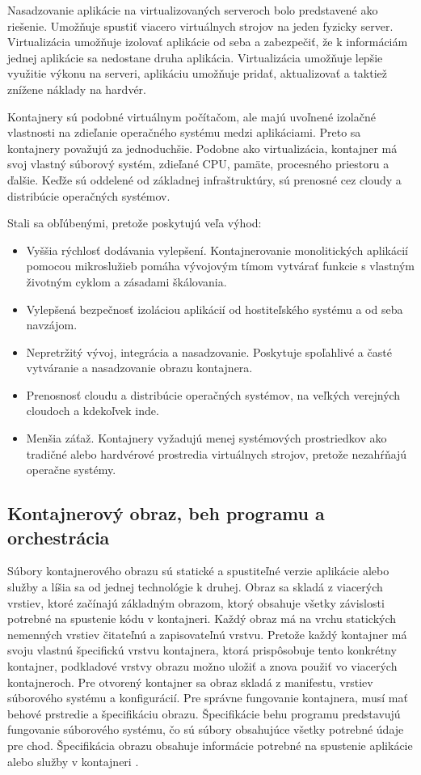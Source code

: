 Nasadzovanie aplikácie na virtualizovaných serveroch bolo predstavené ako riešenie. Umožňuje spustiť viacero virtuálnych strojov na jeden fyzicky server. Virtualizácia umožňuje izolovať aplikácie od seba a zabezpečiť, že k informáciám jednej aplikácie sa nedostane druha aplikácia. Virtualizácia umožňuje lepšie využitie výkonu na serveri, aplikáciu umožňuje pridať, aktualizovať a taktiež znížene náklady na hardvér.

Kontajnery sú podobné virtuálnym počítačom, ale majú uvoľnené izolačné vlastnosti na zdieľanie operačného systému medzi aplikáciami. Preto sa kontajnery považujú za jednoduchšie. Podobne ako virtualizácia, kontajner má svoj vlastný súborový systém, zdieľané CPU, pamäte, procesného priestoru a ďalšie. Keďže sú oddelené od základnej infraštruktúry, sú prenosné cez cloudy a distribúcie operačných systémov.

Stali sa obľúbenými, pretože poskytujú veľa výhod:

\begin{itemize}
    \item Vyššia rýchlosť dodávania vylepšení. Kontajnerovanie monolitických aplikácií pomocou mikroslužieb pomáha vývojovým tímom vytvárať funkcie s vlastným životným cyklom a zásadami škálovania.
	\item Vylepšená bezpečnosť izoláciou aplikácií od hostiteľského systému a od seba navzájom.
	\item Nepretržitý vývoj, integrácia a nasadzovanie. Poskytuje spoľahlivé a časté vytváranie a nasadzovanie obrazu kontajnera.
	\item Prenosnosť cloudu a distribúcie operačných systémov, na veľkých verejných cloudoch a kdekoľvek inde.
	\item Menšia záťaž. Kontajnery vyžadujú menej systémových prostriedkov ako tradičné alebo hardvérové prostredia virtuálnych strojov, pretože nezahŕňajú operačne systémy.
\end{itemize}

\subsection{Kontajnerový obraz, beh programu a orchestrácia}

Súbory kontajnerového obrazu sú statické a spustiteľné verzie aplikácie alebo služby a líšia sa od jednej technológie k druhej. Obraz sa skladá z viacerých vrstiev, ktoré začínajú základným obrazom, ktorý obsahuje všetky závislosti potrebné na spustenie kódu v kontajneri. Každý obraz má na vrchu statických nemenných vrstiev čitateľnú a zapisovateľnú vrstvu. Pretože každý kontajner má svoju vlastnú špecifickú vrstvu kontajnera, ktorá prispôsobuje tento konkrétny kontajner, podkladové vrstvy obrazu možno uložiť a znova použiť vo viacerých kontajneroch. Pre otvorený kontajner sa obraz skladá z manifestu, vrstiev súborového systému a konfigurácií. Pre správne fungovanie kontajnera, musí mať behové prstredie a špecifikáciu obrazu. Špecifikácie behu programu predstavujú fungovanie súborového systému, čo sú súbory obsahujúce všetky potrebné údaje pre chod. Špecifikácia obrazu obsahuje informácie potrebné na spustenie aplikácie alebo služby v kontajneri \cite{orchestrate}.

